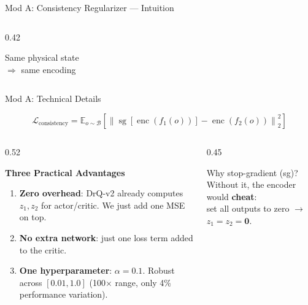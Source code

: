 \documentclass[aspectratio=169]{beamer}
\newcommand{\good}[1]{\textcolor{SuccessGreen}{\textbf{#1}}}
\newcommand{\bad}[1]{\textcolor{DangerRed}{\textbf{#1}}}
\begin{document}
\begin{frame}{Mod A: Consistency Regularizer --- Intuition}
\begin{columns}[T]
\begin{column}{0.42\textwidth}

\vspace{0.3em}
{\footnotesize Same physical state\\$\Rightarrow$ same encoding}
\end{column}
\end{columns}
\end{frame}


\begin{frame}{Mod A: Technical Details}

\vspace{-0.2em}
\begin{equation*}
\mathcal{L}_{\text{consistency}} = \mathbb{E}_{o \sim \mathcal{B}} \left[\left\| \operatorname{sg}[\operatorname{enc}(f_1(o))] - \operatorname{enc}(f_2(o)) \right\|_2^2 \right]
\end{equation*}
\vspace{-0.3em}

\small
\begin{columns}[T]
\begin{column}{0.52\textwidth}
\begin{exampleblock}{\good{Three Practical Advantages}}
\begin{enumerate}\setlength{\itemsep}{3pt}
    \item \good{Zero overhead}: DrQ-v2 already computes $z_1, z_2$ for actor/critic. We just add one MSE on top.
    \item \good{No extra network}: just one loss term added to the critic.
    \item \good{One hyperparameter}: $\alpha = 0.1$. Robust across $[0.01, 1.0]$ (100$\times$ range, only 4\% performance variation).
\end{enumerate}
\end{exampleblock}
\end{column}
\begin{column}{0.45\textwidth}
\begin{alertblock}{Why stop-gradient (sg)?}
Without it, the encoder would \bad{cheat}:\\
set all outputs to zero $\to$ $z_1 = z_2 = \mathbf{0}$.


\end{alertblock}
\end{column}
\end{columns}
\end{frame}
\end{document}
